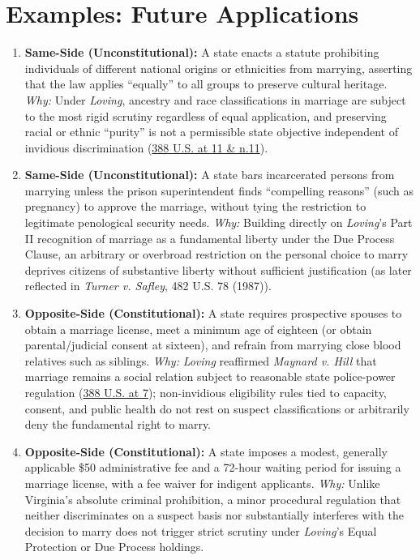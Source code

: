 \documentclass[12pt]{article}
\begin{document}
\section{Examples: Future Applications}
\begin{enumerate}
\item \textbf{Same-Side (Unconstitutional):} A state enacts a statute prohibiting individuals of different national origins or ethnicities from marrying, asserting that the law applies ``equally'' to all groups to preserve cultural heritage. \textit{Why:} Under \textit{Loving}, ancestry and race classifications in marriage are subject to the most rigid scrutiny regardless of equal application, and preserving racial or ethnic ``purity'' is not a permissible state objective independent of invidious discrimination (\href{https://supreme.justia.com/cases/federal/us/388/1/}{388 U.S. at 11 \& n.11}).
\item \textbf{Same-Side (Unconstitutional):} A state bars incarcerated persons from marrying unless the prison superintendent finds ``compelling reasons'' (such as pregnancy) to approve the marriage, without tying the restriction to legitimate penological security needs. \textit{Why:} Building directly on \textit{Loving}'s Part II recognition of marriage as a fundamental liberty under the Due Process Clause, an arbitrary or overbroad restriction on the personal choice to marry deprives citizens of substantive liberty without sufficient justification (as later reflected in \textit{Turner v. Safley}, 482 U.S. 78 (1987)).
\item \textbf{Opposite-Side (Constitutional):} A state requires prospective spouses to obtain a marriage license, meet a minimum age of eighteen (or obtain parental/judicial consent at sixteen), and refrain from marrying close blood relatives such as siblings. \textit{Why:} \textit{Loving} reaffirmed \textit{Maynard v. Hill} that marriage remains a social relation subject to reasonable state police-power regulation (\href{https://supreme.justia.com/cases/federal/us/388/1/}{388 U.S. at 7}); non-invidious eligibility rules tied to capacity, consent, and public health do not rest on suspect classifications or arbitrarily deny the fundamental right to marry.
\item \textbf{Opposite-Side (Constitutional):} A state imposes a modest, generally applicable \$50 administrative fee and a 72-hour waiting period for issuing a marriage license, with a fee waiver for indigent applicants. \textit{Why:} Unlike Virginia's absolute criminal prohibition, a minor procedural regulation that neither discriminates on a suspect basis nor substantially interferes with the decision to marry does not trigger strict scrutiny under \textit{Loving}'s Equal Protection or Due Process holdings.

\end{enumerate}
\end{document}
